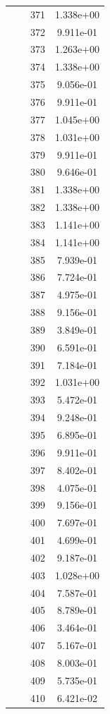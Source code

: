 \documentclass[12pt]{article}
\begin{document}
\begin{longtable}{@{}cccc@{}}
 &  & 371 & 1.338e+00 \\
 &  & 372 & 9.911e-01 \\
 &  & 373 & 1.263e+00 \\
 &  & 374 & 1.338e+00 \\
 &  & 375 & 9.056e-01 \\
 &  & 376 & 9.911e-01 \\
 &  & 377 & 1.045e+00 \\
 &  & 378 & 1.031e+00 \\
 &  & 379 & 9.911e-01 \\
 &  & 380 & 9.646e-01 \\
 &  & 381 & 1.338e+00 \\
 &  & 382 & 1.338e+00 \\
 &  & 383 & 1.141e+00 \\
 &  & 384 & 1.141e+00 \\
 &  & 385 & 7.939e-01 \\
 &  & 386 & 7.724e-01 \\
 &  & 387 & 4.975e-01 \\
 &  & 388 & 9.156e-01 \\
 &  & 389 & 3.849e-01 \\
 &  & 390 & 6.591e-01 \\
 &  & 391 & 7.184e-01 \\
 &  & 392 & 1.031e+00 \\
 &  & 393 & 5.472e-01 \\
 &  & 394 & 9.248e-01 \\
 &  & 395 & 6.895e-01 \\
 &  & 396 & 9.911e-01 \\
 &  & 397 & 8.402e-01 \\
 &  & 398 & 4.075e-01 \\
 &  & 399 & 9.156e-01 \\
 &  & 400 & 7.697e-01 \\
 &  & 401 & 4.699e-01 \\
 &  & 402 & 9.187e-01 \\
 &  & 403 & 1.028e+00 \\
 &  & 404 & 7.587e-01 \\
 &  & 405 & 8.789e-01 \\
 &  & 406 & 3.464e-01 \\
 &  & 407 & 5.167e-01 \\
 &  & 408 & 8.003e-01 \\
 &  & 409 & 5.735e-01 \\
 &  & 410 & 6.421e-02 \\

\end{longtable}
\end{document}
